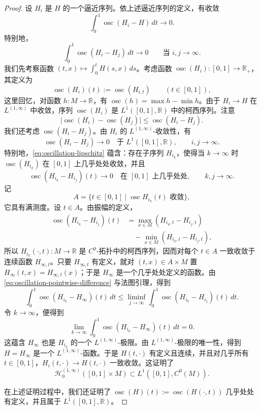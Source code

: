 \begin{proof}
设 $H_i$ 是 $H$ 的一个逼近序列。依上述逼近序列的定义，有收敛
\[
 \int_0^1\operatorname{osc}(H_i-H)\,dt\longrightarrow0.
\]
特别地，
\[
 \int_0^1\operatorname{osc}(H_i-H_j)\,dt\longrightarrow0
 \qquad\text{当 }i,j\to\infty.
\]
我们先考察函数
$(t,x)\mapsto\int_0^tH(s,x)\,ds$。考虑函数
$\operatorname{osc}(H_i):[0,1]\to\mathbb R_+$，其定义为
\[
 \operatorname{osc}(H_i)(t):=\operatorname{osc}(H_{i,t})
 \qquad(t\in[0,1]),
\]
这里回忆，对函数 $h:M\to\mathbb R$，有
$\operatorname{osc}(h)=\max h-\min h$。由于
$H_i\to H$ 在 $L^{(1,\infty)}$ 中收敛，序列
$\operatorname{osc}(H_i)$ 是 $L^1([0,1],\mathbb R)$ 中的柯西序列。注意
\begin{equation}
 \bigl|\operatorname{osc}(H_i)-\operatorname{osc}(H_j)\bigr|
 \leq\operatorname{osc}(H_i-H_j).
 \label{eq:oscillation-lipschitz}
\end{equation}
我们还考虑 $\operatorname{osc}(H_i-H_j)$。由 $H_i$ 的
$L^{(1,\infty)}$-收敛性，有
\[
 \operatorname{osc}(H_i-H_j)\longrightarrow0
 \quad\text{于 }L^1([0,1],\mathbb R),
 \qquad i,j\to\infty.
\]
特别地，\eqref{eq:oscillation-lipschitz} 蕴含：存在子序列
$H_{i_k}$，使得当 $k\to\infty$ 时
$\operatorname{osc}(H_{i_k})$ 在 $[0,1]$ 上几乎处处收敛，并且
\[
 \operatorname{osc}(H_{i_k}-H_{i_j})(t)\longrightarrow0
 \quad\text{在 }[0,1]\text{ 上几乎处处},
 \qquad k,j\to\infty.
\]
记
\[
 A=\{t\in[0,1]\mid \operatorname{osc}H_{i_k}(t)\text{ 收敛}\},
\]
它具有满测度。设 $t\in A$。由振幅的定义，
\begin{equation}
\begin{split}
 \operatorname{osc}(H_{i_k}-H_{i_j})(t)
 &={\max}_{x\in M}(H_{i_k,t}-H_{i_j,t})\\
 &\quad-{\min}_{x\in M}(H_{i_k,t}-H_{i_j,t}),
\end{split}
 \label{eq:oscillation-pointwise-difference}
\end{equation}
所以 $H_{i_k}(\mathord\cdot,t):M\to\mathbb R$ 是
$C^0$-拓扑中的柯西序列，因而对每个 $t\in A$ 一致收敛于连续函数
$H_{\infty,t}$。只要 $H_{\infty,t}$ 有定义，就对
$(t,x)\in A\times M$ 置
$H_\infty(t,x)=H_{\infty,t}(x)$；于是 $H_\infty$ 是一个几乎处处定义的函数。由
\eqref{eq:oscillation-pointwise-difference} 与法图引理，得到
\[
 \int_0^1\operatorname{osc}(H_{i_k}-H_\infty)(t)\,dt
 \leq\liminf_{j\to\infty}
 \int_0^1\operatorname{osc}(H_{i_k}-H_{i_j})(t)\,dt.
\]
令 $k\to\infty$，便得到
\[
 \lim_{k\to\infty}
 \int_0^1\operatorname{osc}(H_{i_k}-H_\infty)(t)\,dt=0.
\]
这蕴含 $H_\infty$ 也是 $H_{i_k}$ 的一个
$L^{(1,\infty)}$-极限。由 $L^{(1,\infty)}$-极限的唯一性，得到
$H=H_\infty$ 是一个 $L^{(1,\infty)}$-函数。于是
$H(t,\mathord\cdot)$ 有定义且连续，并且对几乎所有
$t\in[0,1]$，$H_i(t,\mathord\cdot)\to H(t,\mathord\cdot)$ 一致收敛。这证明了
\[
 \mathcal H_0^{(1,\infty)}([0,1]\times M)
 \subset L^1([0,1],C^0(M)).
\]

在上述证明过程中，我们还证明了
$\operatorname{osc}(H)(t):=\operatorname{osc}(H(\mathord\cdot,t))$
几乎处处有定义，并且属于 $L^1([0,1],\mathbb R)$。
\end{proof}
